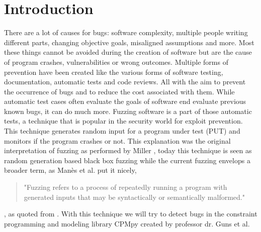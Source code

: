 \chapter{Introduction}
\label{cha:intro}
\label{intro:intro}
There are a lot of causes for bugs: software complexity, multiple people writing different parts, changing objective goals, misaligned assumptions and more. Most these things cannot be avoided during the creation of software but are the cause of program crashes, vulnerabilities or wrong outcomes. Multiple forms of prevention have been created like the various forms of software testing, documentation, automatic tests and code reviews. All with the aim to prevent the occurrence of bugs and to reduce the cost associated with them. While automatic test cases often evaluate the goals of software end evaluate previous known bugs, it can do much more. Fuzzing software is a part of those automatic tests, a technique that is popular in the security world for exploit prevention. This technique generates random input for a program under test (PUT) and monitors if the program crashes or not. This explanation was the original interpretation of fuzzing as performed by Miller \cite{4originalFuzzingUnixUtils}, today this technique is seen as random generation based black box fuzzing while the current fuzzing envelops a broader term, as Man\`es et al. \cite{13manes2019survey} put it nicely,
\begin{quote}
"Fuzzing refers to a process of repeatedly running a program with generated inputs that may be syntactically or semantically malformed."
\end{quote}, as quoted from \cite{13manes2019survey}.
With this technique we will try to detect bugs in the constraint programming and modeling library CPMpy \cite{17guns2019increasing} created by professor dr. Guns et al.

